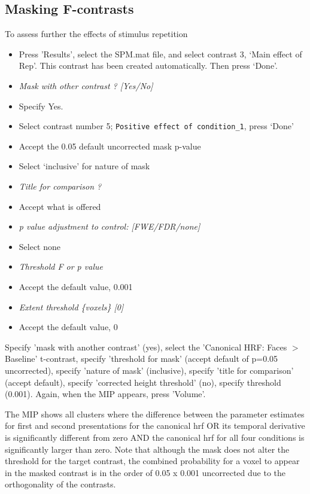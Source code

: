 \subsection{Masking F-contrasts}

To assess further the effects of stimulus repetition

\begin{itemize}
\item{Press 'Results', select the SPM.mat file, and select contrast 3, `Main effect of Rep'. This contrast has been created automatically. Then press `Done'.}
\item{\em Mask with other contrast ? [Yes/No]}
\item{Specify Yes.}
\item{Select contrast number 5; \verb!Positive effect of condition_1!, press `Done'}
\item{Accept the 0.05 default uncorrected mask p-value}
\item{Select `inclusive' for nature of mask}
\item{\em Title for comparison ?}
\item{Accept what is offered}
\item{\em p value adjustment to control: [FWE/FDR/none]}
\item{Select none}
\item{\em Threshold F or p value}
\item{Accept the default value, 0.001}
\item{\em Extent threshold \{voxels\} [0]}
\item{Accept the default value, 0}
\end{itemize}

Specify 'mask with another contrast' (yes), select the 'Canonical HRF: Faces $>$ Baseline' t-contrast, specify 'threshold for mask' (accept default of p=0.05 uncorrected), specify 'nature of mask' (inclusive), specify 'title for comparison' (accept default), specify 'corrected height threshold' (no), specify threshold (0.001). Again, when the MIP appears, press 'Volume'.

The MIP shows all clusters where the difference between the parameter estimates for first and second presentations for the canonical hrf OR its temporal derivative is significantly different from zero AND the canonical hrf for all four conditions is significantly larger than zero. Note that although the mask does not alter the threshold for the target contrast, the combined probability for a voxel to appear in the masked contrast is in the order of 0.05 x 0.001 uncorrected due to the orthogonality of the contrasts. 

